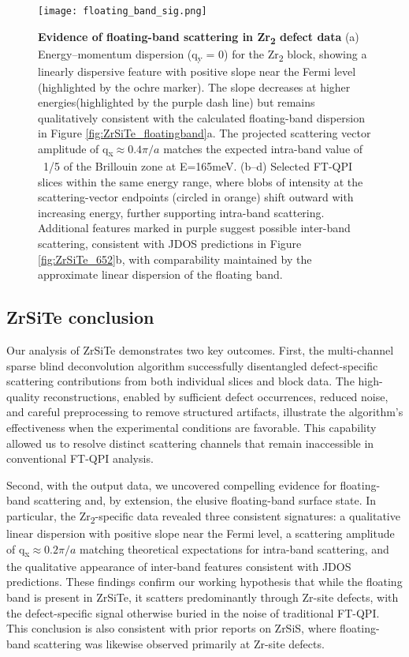 \begin{figure}
	\texttt{[image: floating\_band\_sig.png]} 
	\centering
	\captionsetup{width=1.2\textwidth}
	\caption[\textbf{ Evidence of floating-band scattering in Zr\textsubscript{2} defect data}]{\textbf{ Evidence of floating-band scattering in Zr\textsubscript{2} defect data}
		(a) Energy–momentum dispersion (q\textsubscript{y} = 0) for the Zr\textsubscript{2} block, showing a linearly dispersive feature with positive slope near the Fermi level (highlighted by the ochre marker). The slope decreases at higher energies(highlighted by the purple dash line) but remains qualitatively consistent with the calculated floating-band dispersion in Figure \ref{fig:ZrSiTe_floatingband}a. The projected scattering vector amplitude of q\textsubscript{x}$\approx 0.4 \pi/a$ matches the expected intra-band value of ~1/5 of the Brillouin zone at 
		E=165meV. (b–d) Selected FT-QPI slices within the same energy range, where blobs of intensity at the scattering-vector endpoints (circled in orange) shift outward with increasing energy, further supporting intra-band scattering. Additional features marked in purple suggest possible inter-band scattering, consistent with JDOS predictions in Figure \ref{fig:ZrSiTe_652}b, with comparability maintained by the approximate linear dispersion of the floating band.}
	\label{fig:Zr2_floatingband}
\end{figure}

\subsection{ZrSiTe conclusion}
Our analysis of ZrSiTe demonstrates two key outcomes. First, the multi-channel sparse blind deconvolution algorithm successfully disentangled defect-specific scattering contributions from both individual slices and block data. The high-quality reconstructions, enabled by sufficient defect occurrences, reduced noise, and careful preprocessing to remove structured artifacts, illustrate the algorithm’s effectiveness when the experimental conditions are favorable. This capability allowed us to resolve distinct scattering channels that remain inaccessible in conventional FT-QPI analysis.

Second, with the output data, we uncovered compelling evidence for floating-band scattering and, by extension, the elusive floating-band surface state. In particular, the Zr\textsubscript{2}-specific data revealed three consistent signatures: a qualitative linear dispersion with positive slope near the Fermi level, a scattering amplitude of q\textsubscript{x}$\approx 0.2\pi/a$ matching theoretical expectations for intra-band scattering, and the qualitative appearance of inter-band features consistent with JDOS predictions. These findings confirm our working hypothesis that while the floating band is present in ZrSiTe, it scatters predominantly through Zr-site defects, with the defect-specific signal otherwise buried in the noise of traditional FT-QPI. This conclusion is also consistent with prior reports on ZrSiS, where floating-band scattering was likewise observed primarily at Zr-site defects.

